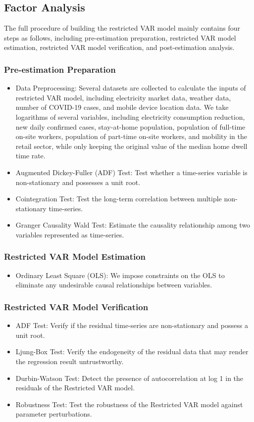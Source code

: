 \documentclass[10pt]{article}
\numberwithin{equation}{section}
\numberwithin{table}{section}
\numberwithin{figure}{section}
\begin{document}
\subsection{Factor Analysis}
The full procedure of building the restricted VAR model mainly contains four steps as follows, including pre-estimation preparation, restricted VAR model estimation, restricted VAR model verification, and post-estimation analysis.
\subsubsection{Pre-estimation Preparation}
\begin{itemize}
  \item Data Preprocessing: Several datasets are collected to calculate the inputs of restricted VAR model, including electricity market data, weather data, number of COVID-19 cases, and mobile device location data. We take logarithms of several variables, including electricity consumption reduction, new daily confirmed cases, stay-at-home population, population of full-time on-site workers, population of part-time on-site workers, and mobility in the retail sector, while only keeping the original value of the median home dwell time rate.
  \item Augmented Dickey-Fuller (ADF) Test: Test whether a time-series variable is non-stationary and possesses a unit root.
  \item Cointegration Test: Test the long-term correlation between multiple non-stationary time-series.
  \item Granger Causality Wald Test: Estimate the causality relationship among two variables represented as time-series.
\end{itemize}
\subsubsection{Restricted VAR Model Estimation}
\begin{itemize}
  \item  Ordinary Least Square (OLS): We impose constraints on the OLS to eliminate any undesirable causal relationships between variables.
\end{itemize}
\subsubsection{Restricted VAR Model Verification}
\begin{itemize}
  \item ADF Test: Verify if the residual time-series are non-stationary and possess a unit root.
  \item Ljung-Box Test: Verify the endogeneity of the residual data that may render the regression result untrustworthy.
  \item Durbin-Watson Test: Detect the presence of autocorrelation at log 1 in the residuals of the Restricted VAR model.
  \item Robustness Test: Test the robustness of the Restricted VAR model against parameter perturbations.
\end{itemize}
\end{document}
